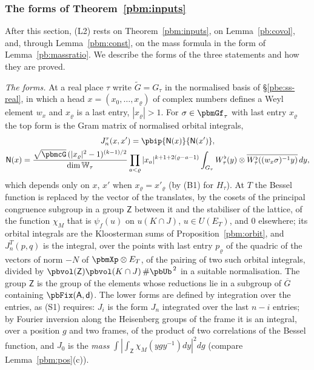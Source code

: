\documentclass[10pt]{amsart}
\theoremstyle{definition}
\theoremstyle{remark}
\providecommand{\auG}{\overline G}
\providecommand{\aubar}[1]{\overline{#1}}
\begin{document}
\subsubsection{The forms of Theorem~\ref{pbm:inputs}}\label{pbm:ss-remains}

After this section, \textup{(L2)} rests on Theorem~\ref{pbm:inputs}, on Lemma~\ref{pb:covol}, and,
through Lemma~\ref{pbm:const}, on the mass formula in the form of Lemma~\ref{pb:massratio}. We
describe the forms of the three statements and how they are proved.

\emph{The forms.} At a real place $\tau$ write $\tilde G=G_\tau$ in the normalised basis of
\S\ref{pbe:ss-real}, in which a head $x=(x_0,\dots,x_\varrho)$ of complex numbers defines a Weyl
element $w_x$ and $x_\varrho$ is a last entry, $|x_\varrho|>1$. For $\sigma\in\pbmGf_\tau$ with last
entry $x_\varrho$ the top form is the Gram matrix of normalised orbital integrals,
\begin{gather*}
J^\tau_n(x,x')=\pbip{\mathsf N(x)}{\mathsf N(x')},\\
\mathsf N(x)=\frac{\sqrt{\pbmcG}\,(|x_\varrho|^2-1)^{(k-1)/2}}{\dim\mathbb W_\tau}\prod_{a<\varrho}|x_a|^{
k+1+2(\varrho-a-1)}\int_{G_\tau}W^\flat_\tau(y)\otimes\aubar{W^\flat_\tau((w_x\sigma)^{-1}y)}\,dy,
\end{gather*}
which depends only on $x$, $x'$ when $x_\varrho=x'_\varrho$ (by (B1) for $H_\tau$). At $T$ the
Bessel function is replaced by the vector of the translates, by the cosets of the principal
congruence subgroup in a group $\mathsf Z$ between it and the stabiliser of the lattice, of the
function $\chi_M$ that is $\psi_f(u)$ on $u(K\cap J)$, $u\in U(E_T)$, and $0$ elsewhere; its
orbital integrals are the Kloosterman sums of Proposition~\ref{pbm:orbit}, and $J^T_n(p,q)$ is the
integral, over the points with last entry $p_\varrho$ of the quadric of the vectors of norm $-N$
of $\pbmXp\otimes E_T$, of the pairing of two such orbital integrals, divided by $\pbvol(\mathsf Z)
\pbvol(K\cap J)\,\#\pbUb^{\,2}$ in a suitable normalisation. The group $\mathsf Z$ is the group of
the elements whose reductions lie in a subgroup of $\auG$ containing $\pbFix(\mathsf A,\mathsf d)$.
The lower forms are defined by integration over the entries, as (S1) requires: $J_i$ is the form
$J_n$ integrated over the last $n-i$ entries; by Fourier inversion along the Heisenberg groups of
the frame it is an integral, over a position $g$ and two frames, of the product of two
correlations of the Bessel function, and $J_0$ is the \emph{mass} $\int|\int_{\mathsf Z}\chi_M(ygy^{
-1})dy|^2dg$ (compare Lemma~\ref{pbm:pos}(c)).
\end{document}
